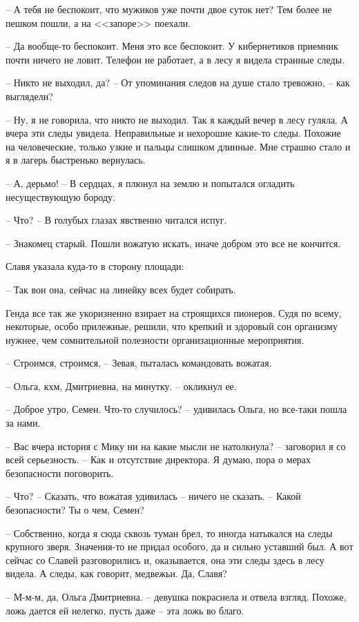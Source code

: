 \documentclass[a4paper]{book}
\begin{document}
-- А тебя не беспокоит, что мужиков уже почти двое суток нет? Тем более не пешком пошли, а на <<запоре>> поехали.

-- Да вообще-то беспокоит. Меня это все беспокоит. У кибернетиков приемник почти ничего не ловит. Телефон не работает, а в лесу я видела странные следы. 

-- Никто не выходил, да? -- От упоминания следов на душе стало тревожно, -- как выглядели?

-- Ну, я не говорила, что никто не выходил. Так я каждый вечер в лесу гуляла. А вчера эти следы увидела. Неправильные и нехорошие какие-то следы. Похожие на человеческие, только узкие и пальцы слишком длинные. Мне страшно стало и я в лагерь быстренько вернулась. 

-- А, дерьмо! -- В сердцах, я плюнул на землю и попытался огладить несуществующую бороду. 

-- Что? -- В голубых глазах явственно читался испуг.

-- Знакомец старый. Пошли вожатую искать, иначе добром это все не кончится. 

Славя указала куда-то в сторону площади:

-- Так вон она, сейчас на линейку всех будет собирать.

Генда все так же укоризненно взирает на строящихся пионеров. Судя по всему, некоторые, особо прилежные, решили, что крепкий и здоровый сон организму нужнее, чем  сомнительной полезности организационные мероприятия.

-- Строимся, строимся, -- Зевая, пыталась командовать вожатая.

-- Ольга, кхм, Дмитриевна, на минутку. -- окликнул ее.

-- Доброе утро, Семен. Что-то случилось? -- удивилась Ольга, но все-таки пошла за нами. 

-- Вас вчера история с Мику ни на какие мысли не натолкнула? -- заговорил я со всей серьезность. -- Как и отсутствие директора. Я думаю, пора о мерах безопасности поговорить.

-- Что? -- Сказать, что вожатая удивилась -- ничего не сказать. -- Какой безопасности? Ты о чем, Семен?

-- Собственно, когда я сюда сквозь туман брел, то иногда натыкался на следы крупного зверя. Значения-то не придал особого, да и сильно уставший был. А вот сейчас со Славей разговорились и, оказывается, она эти следы  здесь в лесу видела. А следы, как говорит, медвежьи. Да, Славя?

-- М-м-м, да, Ольга Дмитриевна. -- девушка покраснела и отвела взгляд. Похоже, ложь дается ей нелегко, пусть даже -- эта ложь во благо.
\end{document}
